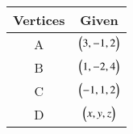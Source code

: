 \begin{tabular}[12pt]{ |c| c|}
    \hline
    \textbf{Vertices} & \textbf{Given}\\ 
    \hline
     A & $\begin{pmatrix}3,-1,2\end{pmatrix}$ \\
    \hline 
     B & $\begin{pmatrix}1,-2,4\end{pmatrix}$\\
    \hline
     C& $\begin{pmatrix}-1,1,2\end{pmatrix}$\\
    \hline
     D & $\begin{pmatrix}x,y,z\end{pmatrix}$\\
    \hline   
    \end{tabular}
